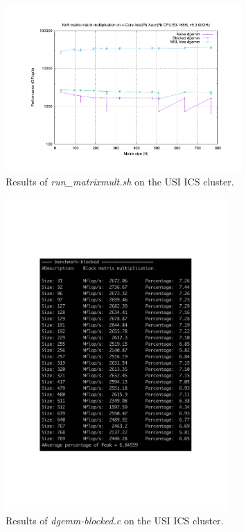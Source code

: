 \documentclass[unicode,11pt,a4paper,oneside,numbers=endperiod,openany]{scrartcl}
\begin{document}
\begin{figure}[h!]
	\centering
	\includegraphics[width=0.8\textwidth]{Figures/timing.pdf}
	\caption{Results of \textit{run\_matrixmult.sh} on the USI ICS cluster.}
	\label{fig:clustyPerfGraph}
\end{figure}

\begin{figure}[h!]
	\centering
	\includegraphics[width=0.75\textwidth]{Figures/cluster_performance.pdf}
	\vskip -0.9in
	\caption{Results of \textit{dgemm-blocked.c} on the USI ICS cluster.}
	\label{fig:clustyPerf}
\end{figure}
\end{document}
